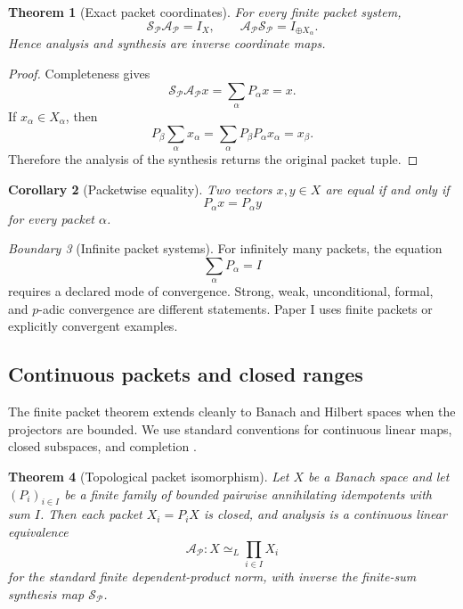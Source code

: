 \documentclass[11pt]{article}
\newtheorem{theorem}{Theorem}[section]
\newtheorem{corollary}[theorem]{Corollary}
\theoremstyle{definition}
\theoremstyle{remark}
\newtheorem{boundary}[theorem]{Boundary}
\newcommand{\cP}{\mathcal P}
\begin{document}
\begin{theorem}[Exact packet coordinates]
\label{thm:analysis-synthesis}
For every finite packet system,
\[
\boxed{
\mathcal S_{\cP}\mathcal A_{\cP}=I_X,
\qquad
\mathcal A_{\cP}\mathcal S_{\cP}=I_{\oplus X_{\alpha}}.
}
\]
Hence analysis and synthesis are inverse coordinate maps.
\end{theorem}

\begin{proof}
Completeness gives
\[
\mathcal S_{\cP}\mathcal A_{\cP}x
=
\sum_{\alpha}P_{\alpha}x=x.
\]
If $x_{\alpha}\in X_{\alpha}$, then
\[
P_{\beta}\sum_{\alpha}x_{\alpha}
=
\sum_{\alpha}P_{\beta}P_{\alpha}x_{\alpha}
=x_{\beta}.
\]
Therefore the analysis of the synthesis returns the original packet tuple.
\end{proof}

\begin{corollary}[Packetwise equality]
\label{cor:packetwise-equality}
Two vectors $x,y\in X$ are equal if and only if
\[
P_{\alpha}x=P_{\alpha}y
\]
for every packet $\alpha$.
\end{corollary}

\begin{boundary}[Infinite packet systems]
For infinitely many packets, the equation
\[
\sum_{\alpha}P_{\alpha}=I
\]
requires a declared mode of convergence. Strong, weak, unconditional, formal, and $p$-adic convergence are different statements. Paper I uses finite packets or explicitly convergent examples.
\end{boundary}

\subsection{Continuous packets and closed ranges}

The finite packet theorem extends cleanly to Banach and Hilbert spaces when the projectors are bounded. We use standard conventions for continuous linear maps, closed subspaces, and completion \cite[pp.~12--121]{schaeferWolff1999}\cite[pp.~1--123]{conway1990}.

\begin{theorem}[Topological packet isomorphism]
\label{thm:topological-packets}
Let $X$ be a Banach space and let $(P_i)_{i\in I}$ be a finite family of bounded pairwise annihilating idempotents with sum $I$. Then each packet $X_i=P_iX$ is closed, and analysis is a continuous linear equivalence
\[
\boxed{
\mathcal A_{\cP}:X\simeq_L\prod_{i\in I}X_i
}
\]
for the standard finite dependent-product norm, with inverse the finite-sum synthesis map $\mathcal S_{\cP}$.
\end{theorem}
\end{document}
